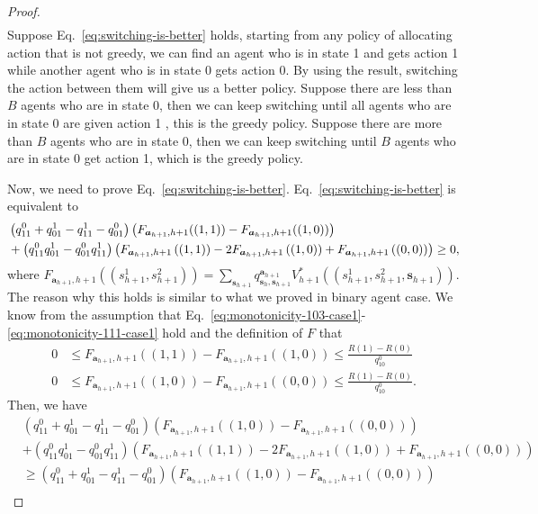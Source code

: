\begin{proof}
\begin{align}
\end{align}
Suppose Eq.~\eqref{eq:switching-is-better} holds, starting from any policy of allocating action that is not greedy, we can find an agent who is in state 1 and gets action 1 while another agent who is in state 0 gets action 0. By using the result, switching the action between them will give us a better policy. Suppose there are less than $B$ agents who are in state 0, then we can keep switching until all agents who are in state 0 are given action 1 , this is the greedy policy. Suppose there are more than $B$ agents who are in state 0, then we can keep switching until $B$ agents who are in state 0 get action 1, which is the greedy policy.

Now, we need to prove Eq.~\eqref{eq:switching-is-better}. Eq.~\eqref{eq:switching-is-better} is equivalent to
\begin{align}
    &\left(q^0_{11}+q^1_{01}-q^1_{11}-q^0_{01}\right)\left(F_{\bm{a}_{h+1},h+1}((1,1))-F_{\bm{a}_{h+1},h+1}((1,0))\right)\notag\\&+\left(q^0_{11}q^1_{01}-q^0_{01}q^1_{11}\right)\left(F_{\bm{a}_{h+1},h+1}\left((1,1)\right)-2F_{\bm{a}_{h+1},h+1}\left((1,0)\right)+F_{\bm{a}_{h+1},h+1}\left((0,0)\right)\right)\geq 0,\label{eq:showing-optimality-multiagent}
\end{align}
where $F_{\bm{a}_{h+1},h+1}\left((s_{h+1}^1,s_{h+1}^2)\right)=\sum_{\bm{s}_{h+1}}q_{\bm{s}_h,\bm{s}_{h+1}}^{\bm{a}_{h+1}}V_{h+1}^*\left((s_{h+1}^1,s_{h+1}^2,\bm{s}_{h+1})\right)$. The reason why this holds is similar to what we proved in binary agent case. We know from the assumption that Eq.~\eqref{eq:monotonicity-103-case1}-\eqref{eq:monotonicity-111-case1} hold and the definition of $F$ that 
\begin{align*}
   0&\leq F_{\bm{a}_{h+1},h+1}((1,1))-F_{\bm{a}_{h+1},h+1}((1,0))\leq \frac{R(1)-R(0)}{q^0_{10}}\\
    0&\leq F_{\bm{a}_{h+1},h+1}((1,0))-F_{\bm{a}_{h+1},h+1}((0,0))\leq \frac{R(1)-R(0)}{q^0_{10}}.
\end{align*}
Then, we have
\begin{align*}
       &\left(q^0_{11}+q^1_{01}-q^1_{11}-q^0_{01}\right)\left(F_{\bm{a}_{h+1},h+1}\left((1,0)\right)-F_{\bm{a}_{h+1},h+1}\left((0,0)\right)\right)\\&+\left(q^0_{11}q^1_{01}-q^0_{01}q^1_{11}\right)\left(F_{\bm{a}_{h+1},h+1}\left((1,1)\right)-2F_{\bm{a}_{h+1},h+1}\left((1,0)\right)+F_{\bm{a}_{h+1},h+1}\left((0,0)\right)\right)\\
    &\geq \left(q^0_{11}+q^1_{01}-q^1_{11}-q^0_{01}\right)\left(F_{\bm{a}_{h+1},h+1}\left((1,0)\right)-F_{\bm{a}_{h+1},h+1}\left((0,0)\right)\right)\\

\end{align*}
\end{proof}
